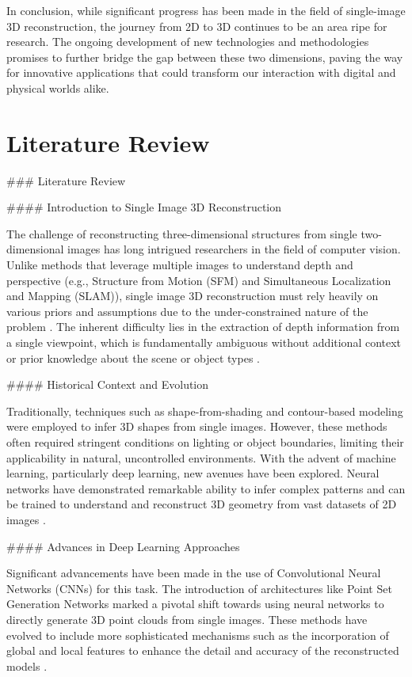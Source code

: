 \documentclass[conference]{IEEEtran}
\begin{document}
In conclusion, while significant progress has been made in the field of single-image 3D reconstruction, the journey from 2D to 3D continues to be an area ripe for research. The ongoing development of new technologies and methodologies promises to further bridge the gap between these two dimensions, paving the way for innovative applications that could transform our interaction with digital and physical worlds alike.

\section{Literature Review}

### Literature Review

#### Introduction to Single Image 3D Reconstruction

The challenge of reconstructing three-dimensional structures from single two-dimensional images has long intrigued researchers in the field of computer vision. Unlike methods that leverage multiple images to understand depth and perspective (e.g., Structure from Motion (SFM) and Simultaneous Localization and Mapping (SLAM)), single image 3D reconstruction must rely heavily on various priors and assumptions due to the under-constrained nature of the problem \cite{fan2016}. The inherent difficulty lies in the extraction of depth information from a single viewpoint, which is fundamentally ambiguous without additional context or prior knowledge about the scene or object types \cite{popov2020}.

#### Historical Context and Evolution

Traditionally, techniques such as shape-from-shading \cite{horn1970} and contour-based modeling were employed to infer 3D shapes from single images. However, these methods often required stringent conditions on lighting or object boundaries, limiting their applicability in natural, uncontrolled environments. With the advent of machine learning, particularly deep learning, new avenues have been explored. Neural networks have demonstrated remarkable ability to infer complex patterns and can be trained to understand and reconstruct 3D geometry from vast datasets of 2D images \cite{xie2019}.

#### Advances in Deep Learning Approaches

Significant advancements have been made in the use of Convolutional Neural Networks (CNNs) for this task. The introduction of architectures like Point Set Generation Networks \cite{fan2016} marked a pivotal shift towards using neural networks to directly generate 3D point clouds from single images. These methods have evolved to include more sophisticated mechanisms such as the incorporation of global and local features to enhance the detail and accuracy of the reconstructed models \cite{xie2019}.
\end{document}
